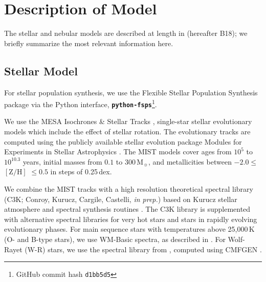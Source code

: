 \documentclass[trackchanges, preprint2]{aastex62}
\newcommand{\FSPS}{{\sc FSPS}\xspace}
\newcommand{\pFSPS}{{\tt \textbf{python-fsps}}\xspace}
\newcommand\Msun{\ensuremath{\mathrm{M_{\sun}}}\xspace}
\begin{document}
\section{Description of Model} \label{sec:model}

The stellar and nebular models are described at length in \citet{Byler+2018} (hereafter B18); we briefly summarize the most relevant information here.

\subsection{Stellar Model} \label{sec:model:stars}

For stellar population synthesis, we use the Flexible Stellar Population Synthesis package \citep[\FSPS;][]{Conroy+2009, Conroy+2010} via the Python interface, \pFSPS \citep{pythonFSPSdfm}\footnote{GitHub commit hash \texttt{d1bb5d5}}.

We use the MESA Isochrones \& Stellar Tracks \citep[MIST;][]{Dotter+2016, Choi+2016}, single-star stellar evolutionary models which include the effect of stellar rotation. The evolutionary tracks are computed using the publicly available stellar evolution package Modules for Experiments in Stellar Astrophysics \citep[MESA v7503;][]{Paxton+2011,Paxton+2013, Paxton+2015}. The MIST models cover ages from $10^5$ to $10^{10.3}$ years, initial masses from $0.1$ to $300\,$\Msun, and metallicities between $-2.0 \leq$ $[\mathrm{Z}/\mathrm{H}]$ $\leq 0.5$ in steps of 0.25\,dex. 

We combine the MIST tracks with a high resolution theoretical spectral library (C3K; Conroy, Kurucz, Cargile, Castelli, \emph{in prep.}) based on Kurucz stellar atmosphere and spectral synthesis routines \citep[ATLAS12 and SYNTHE,][]{Kurucz+2005}. The C3K library is supplemented with alternative spectral libraries for very hot stars and stars in rapidly evolving evolutionary phases. For main sequence stars with temperatures above 25,000$\,$K (O- and B-type stars), we use WM-Basic \citep{Pauldrach+2001} spectra, as described in \citet{Eldridge+2017}. For Wolf-Rayet (W-R) stars, we use the spectral library from \citet{Smith+2002}, computed using CMFGEN \citep{Hillier+2001}.
\end{document}
